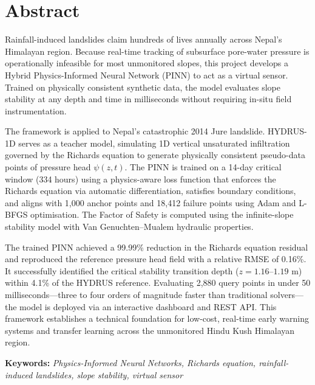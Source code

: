 \documentclass[12pt]{report}
\begin{document}
\chapter*{Abstract}

Rainfall-induced landslides claim hundreds of lives annually across Nepal's Himalayan region. Because real-time tracking of subsurface pore-water pressure is operationally infeasible for most unmonitored slopes, this project develops a Hybrid Physics-Informed Neural Network (PINN) to act as a virtual sensor. Trained on physically consistent synthetic data, the model evaluates slope stability at any depth and time in milliseconds without requiring in-situ field instrumentation.

The framework is applied to Nepal's catastrophic 2014 Jure landslide. HYDRUS-1D serves as a teacher model, simulating 1D vertical unsaturated infiltration governed by the Richards equation to generate physically consistent pseudo-data points of pressure head $\psi(z,t)$. The PINN is trained on a 14-day critical window (334 hours) using a physics-aware loss function that enforces the Richards equation via automatic differentiation, satisfies boundary conditions, and aligns with 1,000 anchor points and 18,412 failure points using Adam and L-BFGS optimisation. The Factor of Safety is computed using the infinite-slope stability model with Van Genuchten--Mualem hydraulic properties.

The trained PINN achieved a 99.99\% reduction in the Richards equation residual and reproduced the reference pressure head field with a relative RMSE of 0.16\%. It successfully identified the critical stability transition depth ($z = 1.16$--$1.19$ m) within 4.1\% of the HYDRUS reference. Evaluating 2,880 query points in under 50 milliseconds—three to four orders of magnitude faster than traditional solvers—the model is deployed via an interactive dashboard and REST API. This framework establishes a technical foundation for low-cost, real-time early warning systems and transfer learning across the unmonitored Hindu Kush Himalayan region.

\vspace{0.5cm}
\noindent\textbf{Keywords:} \textit{Physics-Informed Neural Networks, Richards equation, rainfall-induced landslides, slope stability, virtual sensor}

\tableofcontents
{}
\listoffigures
{}
\listoftables
{}
\end{document}
